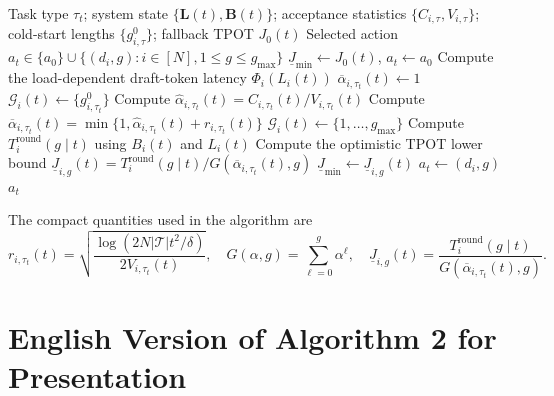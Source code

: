 \documentclass[11pt,a4paper]{ctexart}
\begin{document}
\setcounter{algorithm}{0}
\renewcommand{\theHalgorithm}{appendix.\arabic{algorithm}}
\begin{algorithm}[t]
\caption{UCB-Based Draft Model Selection at the Edge Server}
\label{alg:edge_ucb_selection_en}
\begin{algorithmic}[1]
\Require Task type $\tau_t$; system state $\{\mathbf{L}(t),\mathbf{B}(t)\}$; acceptance statistics $\{C_{i,\tau},V_{i,\tau}\}$; cold-start lengths $\{g_{i,\tau}^{0}\}$; fallback TPOT $J_0(t)$
\Ensure Selected action $a_t\in\{a_0\}\cup\{(d_i,g):i\in[N],1\leq g\leq g_{\max}\}$
\State $\underline{J}_{\min}\gets J_0(t)$, $a_t\gets a_0$
    \State Compute the load-dependent draft-token latency $\Phi_i(L_i(t))$
        \State $\overline{\alpha}_{i,\tau_t}(t)\gets1$
        \State $\mathcal{G}_i(t)\gets\{g_{i,\tau_t}^{0}\}$
    \Else
        \State Compute $\widehat{\alpha}_{i,\tau_t}(t)=C_{i,\tau_t}(t)/V_{i,\tau_t}(t)$
        \State Compute $\overline{\alpha}_{i,\tau_t}(t)=\min\{1,\widehat{\alpha}_{i,\tau_t}(t)+r_{i,\tau_t}(t)\}$
        \State $\mathcal{G}_i(t)\gets\{1,\ldots,g_{\max}\}$
    \EndIf
        \State Compute $T_i^{\mathrm{round}}(g\mid t)$ using $B_i(t)$ and $L_i(t)$
        \State Compute the optimistic TPOT lower bound $\underline{J}_{i,g}(t)=T_i^{\mathrm{round}}(g\mid t)/G(\overline{\alpha}_{i,\tau_t}(t),g)$
            \State $\underline{J}_{\min}\gets\underline{J}_{i,g}(t)$
            \State $a_t\gets(d_i,g)$
        \EndIf
    \EndFor
\EndFor
\State \Return $a_t$
\end{algorithmic}
\end{algorithm}

The compact quantities used in the algorithm are
\begin{equation}
    r_{i,\tau_t}(t)
    =
    \sqrt{
    \frac{\log\!\left(2N|\mathcal{T}|t^2/\delta\right)}
    {2V_{i,\tau_t}(t)}
    },
    \quad
    G(\alpha,g)=\sum_{\ell=0}^{g}\alpha^\ell,
    \quad
    \underline{J}_{i,g}(t)
    =
    \frac{T_i^{\mathrm{round}}(g\mid t)}
    {G(\overline{\alpha}_{i,\tau_t}(t),g)}.
    \label{eq:appendix_algorithm_quantities}
\end{equation}

\section{English Version of Algorithm 2 for Presentation}
\label{app:english_algorithm_2}
\end{document}
